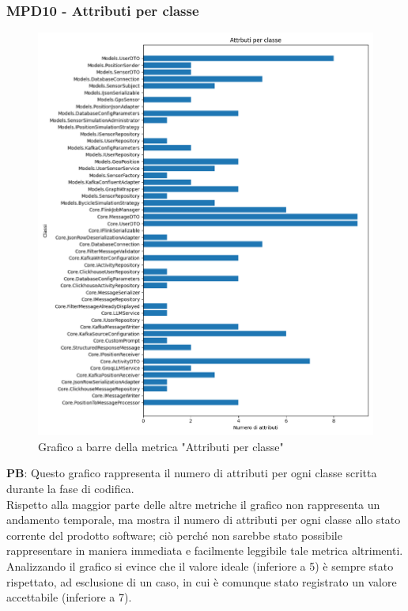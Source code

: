 \documentclass[10pt]{article}
\begin{document}
\begin{justify}




\subsubsection{MPD10 - Attributi per classe}

\begin{figure}[H]
  \centering
  \includegraphics[width=0.9\linewidth]{metrics_attributes.png}
  \caption{Grafico a barre della metrica "Attributi per classe"}
\end{figure}

\textbf{PB}: Questo grafico rappresenta il numero di attributi per ogni classe scritta durante la fase di codifica.\\
Rispetto alla maggior parte delle altre metriche il grafico non rappresenta un andamento temporale, ma mostra il numero di attributi per ogni classe allo stato 
corrente del prodotto software; ciò perché non sarebbe stato possibile rappresentare in maniera immediata e  facilmente leggibile tale metrica altrimenti.\\
Analizzando il grafico si evince che il valore ideale (inferiore a 5) è sempre stato rispettato, ad esclusione di un caso, in cui è comunque stato registrato un valore
accettabile (inferiore a 7).\\



\end{justify}
\end{document}
